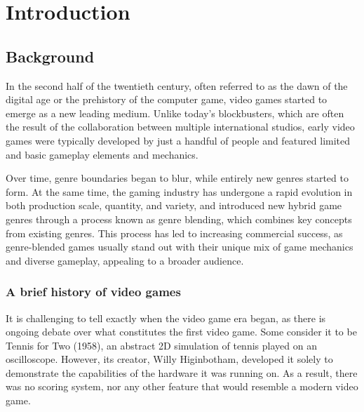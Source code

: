 \chapter{Introduction} \label{Chapter:Introduction}



\section{Background}

In the second half of the twentieth century, often referred to as the dawn of the digital age or the prehistory of the computer game\cite{malliet2005history}, video games started to emerge as a new leading medium. Unlike today's blockbusters, which are often the result of the collaboration between multiple international studios, early video games were typically developed by just a handful of people and featured limited and basic gameplay elements and mechanics. 

Over time, genre boundaries began to blur, while entirely new genres started to form. At the same time, the gaming industry has undergone a rapid evolution in both production scale, quantity, and variety, and introduced new hybrid game genres through a process known as genre blending\cite{arsenault2009}, which combines key concepts from existing genres. This process has led to increasing commercial success, as genre-blended games usually stand out with their unique mix of game mechanics and diverse gameplay, appealing to a broader audience.



\subsection{A brief history of video games}

It is challenging to tell exactly when the video game era began, as there is ongoing debate over what constitutes the first video game. Some consider it to be Tennis for Two (1958)\cite{tennisfortwo1958}, an abstract 2D simulation of tennis played on an oscilloscope. However, its creator, Willy Higinbotham, developed it solely to demonstrate the capabilities of the hardware it was running on. As a result, there was no scoring system, nor any other feature that would resemble a modern video game\cite{malliet2005history}.

